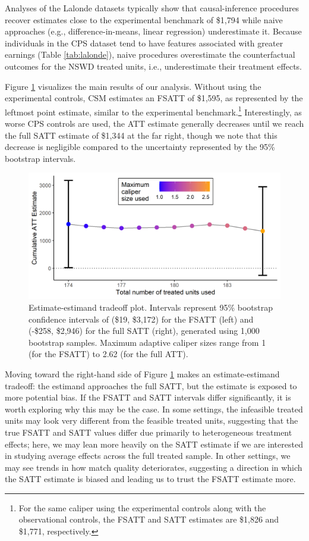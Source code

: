 \documentclass{article}
\begin{document}
Analyses of the Lalonde datasets typically show that causal-inference procedures recover estimates close to the experimental benchmark of \$1,794 while naive approaches (e.g., difference-in-means, linear regression) underestimate it.
Because individuals in the CPS dataset tend to have features associated with greater earnings (Table \ref{tab:lalonde}), naive procedures overestimate the counterfactual outcomes for the NSWD treated units, i.e., underestimate their treatment effects.

Figure \ref{fig:lalonde_att} visualizes the main results of our analysis.
Without using the experimental controls, CSM estimates an FSATT of \$1,595, as represented by the leftmost point estimate, similar to the experimental benchmark.\footnote{For the same caliper using the experimental controls along with the observational controls, the FSATT and SATT estimates are \$1,826 and \$1,771, respectively.}
Interestingly, as worse CPS controls are used, the ATT estimate generally decreases until we reach the full SATT estimate of \$1,344 at the far right,
though we note that this decrease is negligible compared to the uncertainty represented by the 95\% bootstrap intervals.

\begin{figure}[t]
    \centering
    \includegraphics[width=\textwidth]{writeup/figures/lalonde_att.png}
    \caption{Estimate-estimand tradeoff plot. Intervals represent 95\% bootstrap confidence intervals of (\$19, \$3,172) for the FSATT (left) and (-\$258, \$2,946) for the full SATT (right), generated using 1,000 bootstrap samples. Maximum adaptive caliper sizes range from 1 (for the FSATT) to 2.62 (for the full ATT).}
    \label{fig:lalonde_att}
\end{figure}

Moving toward the right-hand side of Figure \ref{fig:lalonde_att} makes an estimate-estimand tradeoff: the estimand approaches the full SATT, but the estimate is exposed to more potential bias.
If the FSATT and SATT intervals differ significantly, it is worth exploring why this may be the case.
In some settings, the infeasible treated units may look very different from the feasible treated units, suggesting that the true FSATT and SATT values differ due primarily to heterogeneous treatment effects;
here, we may lean more heavily on the SATT estimate if we are interested in studying average effects across the full treated sample.
In other settings, we may see trends in how match quality deteriorates, suggesting a direction in which the SATT estimate is biased and leading us to trust the FSATT estimate more.
\end{document}
